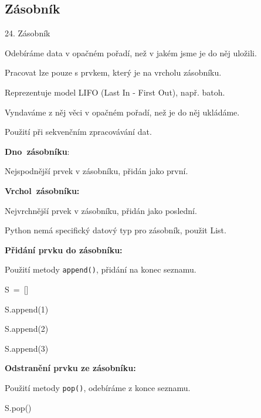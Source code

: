 \documentclass[czech]{beamer}
\newenvironment{lyxcode}
  {\par\begin{list}{}{
    \setlength{\rightmargin}{\leftmargin}
    \setlength{\listparindent}{0pt}%
    \raggedright
    \setlength{\itemsep}{0pt}
    \setlength{\parsep}{0pt}
    \normalfont\ttfamily}%
   \def\{{\char`\{}
   \def\}{\char`\}}
   \def\textasciitilde{\char`\~}
   \item[]}
  {\end{list}}
\begin{document}
\subsection{Zásobník}
\begin{frame}{24. Zásobník}

{\tiny Odebíráme data v opačném pořadí, než v jakém jsme je do něj
uložili.}{\tiny\par}

{\tiny Pracovat lze pouze s prvkem, který je na vrcholu zásobníku.}{\tiny\par}

{\tiny Reprezentuje model LIFO (Last In - First Out), např. batoh.\medskip{}
}{\tiny\par}

{\tiny Vyndaváme z něj věci v opačném pořadí, než je do něj ukládáme.}{\tiny\par}

{\tiny Použití při sekvenčním zpracovávání dat.\medskip{}
}{\tiny\par}

{\tiny\textbf{Dno~zásobníku}}{\tiny :}{\tiny\par}

{\tiny Nejspodnější prvek v zásobníku, přidán jako první.}{\tiny\par}

{\tiny\medskip{}
}{\tiny\par}

{\tiny\textbf{Vrchol~zásobníku:}}{\tiny\par}

{\tiny Nejvrchnější prvek v zásobníku, přidán jako poslední.\medskip{}
}{\tiny\par}

{\tiny Python nemá specifický datový typ pro zásobník, použit List.}{\tiny\par}

{\tiny\medskip{}
}{\tiny\par}

{\tiny\textbf{Přidání prvku do zásobníku:}}{\tiny\par}

{\tiny Použití metody }{\tiny\texttt{append()}}{\tiny , přidání na konec
seznamu.}{\tiny\par}
\begin{lyxcode}
{\tiny S~=~{[}{]}}{\tiny\par}

{\tiny S.append(1)}{\tiny\par}

{\tiny S.append(2)}{\tiny\par}

{\tiny S.append(3)}{\tiny\par}
\end{lyxcode}
{\tiny\textbf{Odstranění prvku ze zásobníku:}}{\tiny\par}

{\tiny Použití metody }{\tiny\texttt{pop()}}{\tiny , odebíráme z konce
seznamu.}{\tiny\par}
\begin{lyxcode}
{\tiny S.pop()}{\tiny\par}
\end{lyxcode}
\end{frame}
\end{document}
